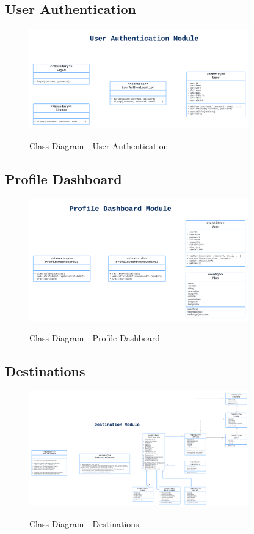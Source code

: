 \documentclass[12pt]{article}
\begin{document}
\subsection{User Authentication}
\begin{figure}[H]
    \centering
        \includegraphics[width=0.85\textwidth]{Class Diagram/User Authentication.png}
        \label{fig:ClassAuth}
    \caption{Class Diagram - User Authentication}
\end{figure}

\subsection{Profile Dashboard}
\begin{figure}[H]
    \centering
        \includegraphics[width=0.85\textwidth]{Class Diagram/Profile Dashboard.png}
        \label{fig:ClassDash}
    \caption{Class Diagram - Profile Dashboard}
\end{figure}

\newpage
\subsection{Destinations}
\begin{figure}[H]
    \centering
        \includegraphics[width=0.85\textwidth]{Class Diagram/Destinations.png}
        \label{fig:ClassDest}
    \caption{Class Diagram - Destinations}
\end{figure}
\end{document}
